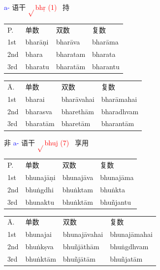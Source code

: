 \documentclass[17pt]{beamer}
\newcommand{\verbroot}[1]{\textcolor{red}{$\sqrt{}$#1}}
\newcommand{\verbstem}[1]{\textcolor{blue}{#1\nobreakdash-}}
\newcommand{\fullpada}[1]{\textcolor{OliveGreen}{#1}}
\begin{document}
\begin{frame}{\verbstem{a} 语干 }
  \small
  \verbroot{bhṛ (1)} ~持
  \bigskip

  \centering 
  \begin{tabular}{@{}llll@{}} %
    P. & 单数  & 双数  & 复数 \\
    1st & \fullpada{bharāṇi} & \cellcolor{yellow!30}\fullpada{bharāva}  & \cellcolor{yellow!30}\fullpada{bharāma}  \\
    2nd & \fullpada{bhara} & \cellcolor{yellow!30}\fullpada{bharatam} & \cellcolor{yellow!30}\fullpada{bharata}  \\
    3rd & \fullpada{bharatu} & \cellcolor{yellow!30}\fullpada{bharatām} & \fullpada{bharantu}  \\
  \end{tabular} 
  \bigskip
    
  \begin{tabular}{@{}llll@{}} %
    Ā. & 单数  & 双数  & 复数 \\
    1st & \fullpada{bharai} & \fullpada{bharāvahai} & \fullpada{bharāmahai} \\
    2nd & \fullpada{bharasva} & \cellcolor{yellow!30}\fullpada{bharethām} & \cellcolor{yellow!30}\fullpada{bharadhvam} \\
    3rd & \fullpada{bharatām} & \cellcolor{yellow!30}\fullpada{bharetām} & \fullpada{bharantām} \\
  \end{tabular}   
\end{frame}

\begin{frame}{非 \verbstem{a} 语干 }
  \small
  \verbroot{bhuj (7)} ~享用
  \bigskip
  
  \centering 
  \begin{tabular}{@{}llll@{}} %
    P. & 单数  & 双数  & 复数 \\
    1st & \cellcolor{light-gray}\fullpada{bhunajāṇi} & \cellcolor{light-gray}\fullpada{bhunajāva}  & \cellcolor{light-gray}\fullpada{bhunajāma}  \\
    2nd & \fullpada{bhuṅgdhi} & \fullpada{bhuṅktam} & \fullpada{bhuṅkta}  \\
    3rd & \cellcolor{light-gray}\fullpada{bhunaktu} & \fullpada{bhuṅktām} & \fullpada{bhuñjantu}  \\
  \end{tabular} 
  \bigskip
    
  \begin{tabular}{@{}llll@{}} %
    Ā. & 单数  & 双数  & 复数 \\
    1st & \cellcolor{light-gray}\fullpada{bhunajai} & \cellcolor{light-gray}\fullpada{bhunajāvahai} & \cellcolor{light-gray}\fullpada{bhunajāmahai} \\
    2nd & \fullpada{bhuṅkṣva} & \fullpada{bhuñjāthām} & \fullpada{bhuṅgdhvam} \\
    3rd & \fullpada{bhuṅktām} & \fullpada{bhuñjātām} & \fullpada{bhuñjatām} \\
  \end{tabular}   
\end{frame}
\end{document}
